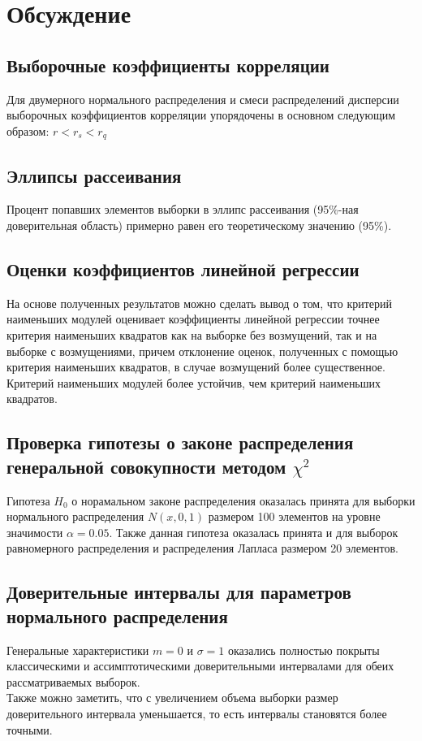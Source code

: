 \section{Обсуждение}

\subsection{Выборочные коэффициенты корреляции}

Для двумерного нормального распределения и смеси распределений дисперсии выборочных коэффициентов корреляции упорядочены в основном следующим образом: $r < r_s < r_q$

\subsection{Эллипсы рассеивания}

Процент попавших элементов выборки в эллипс рассеивания (95\%-ная доверительная область) примерно равен его теоретическому значению (95\%).

\subsection{Оценки коэффициентов линейной регрессии}

На основе полученных результатов можно сделать вывод о том, что критерий наименьших модулей оценивает коэффициенты линейной регрессии точнее критерия наименьших квадратов как на выборке без возмущений, так и на выборке с возмущениями, причем отклонение оценок, полученных с помощью критерия наименьших квадратов, в случае возмущений более существенное. Критерий наименьших модулей более устойчив, чем критерий наименьших квадратов.


\subsection{Проверка гипотезы о законе распределения генеральной совокупности методом $\chi^2$ }

Гипотеза $H_0$ о норамальном законе распределения оказалась принята для выборки нормального распределения $N(x, 0, 1)$ размером 100 элементов на уровне значимости $\alpha = 0.05$. Также данная гипотеза оказалась принята и для выборок равномерного распределения и распределения Лапласа размером 20 элементов.

\subsection{Доверительные интервалы для параметров нормального распределения}

Генеральные характеристики $m = 0$ и $\sigma = 1$ оказались полностью покрыты классическими и ассимптотическими доверительными интервалами для обеих рассматриваемых выборок. \\
Также можно заметить, что с увеличением объема выборки размер доверительного интервала уменьшается, то есть интервалы становятся более точными.\\
  

